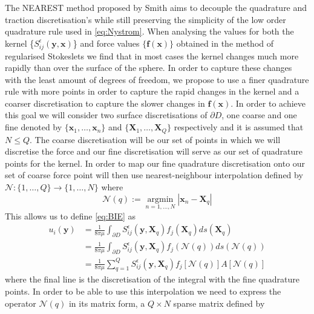 The NEAREST method proposed by Smith \cite{Smith2018AEquation} aims to decouple the quadrature and traction discretisation's while still preserving the simplicity of the low order quadrature rule used in \cref{eq:Nystrom}. When analysing the values for both the kernel \{$S^\epsilon_{ij}(\bm{y},\bm{x})$\} and force values $\{\bm{f}(\bm{x})\}$ obtained in the method of regularised Stokeslets we find that in most cases the kernel changes much more rapidly than over the surface of the sphere. In order to capture these changes with the least amount of degrees of freedom, we propose to use a finer quadrature rule with more points in order to capture the rapid changes in the kernel and a coarser discretisation to capture the slower changes in $\bm{f}(\bm{x})$. In order to achieve this goal we will consider two surface discretisations of $\partial D$, one coarse and one fine denoted by $\{\bm{x}_1, \dots, \bm{x}_n\}$ and $\{\bm{X}_1, \dots, \bm{X}_Q\}$ respectively and it is assumed that $N \leq Q$. The coarse discretisation will be our set of points in which we will discretise the force and our fine discretisation will serve as our set of quadrature points for the kernel. In order to map our fine quadrature discretisation onto our set of coarse force point will then use nearest-neighbour interpolation defined by $\mathcal{N}:\{ 1, \dots, Q\} \to \{ 1, \dots, N\}$ where 
\begin{equation}
    \mathcal{N}(q) := \underset{n=1, \ldots, N}{\operatorname{argmin}}|\boldsymbol{x}_n-\boldsymbol{X}_q|
\end{equation}
This allows us to define \cref{eq:BIE} as 
\begin{equation}
\begin{aligned}
\label{eq:BIENearest1}
        u_i(\bm{y}) &= \frac{1}{8 \pi \mu} \int_{\partial D} S_{i j}^{\epsilon}\left(\bm{y}, \bm{X}_q\right) f_{j}(\bm{X}_q) d s(\bm{X}_q) \\
        &= \frac{1}{8 \pi \mu} \int_{\partial D} S_{i j}^{\epsilon}\left(\bm{y}, \bm{X}_q\right) f_{j}(\mathcal{N}(q)) d s(\mathcal{N}(q)) \\
        & = \frac{1}{8 \pi \mu} \sum_{q=1}^Q S_{i j}^{\epsilon}\left(\bm{y}, \bm{X}_q\right){f_{j}}[\mathcal{N}(q)]A[\mathcal{N}(q)]
\end{aligned}
\end{equation}
where the final line is the discretisation of the integral with the fine quadrature points. In order to be able to use this interpolation we need to express the operator $\mathcal{N}(q)$ in its matrix form, a $Q \times N$ sparse matrix defined by
